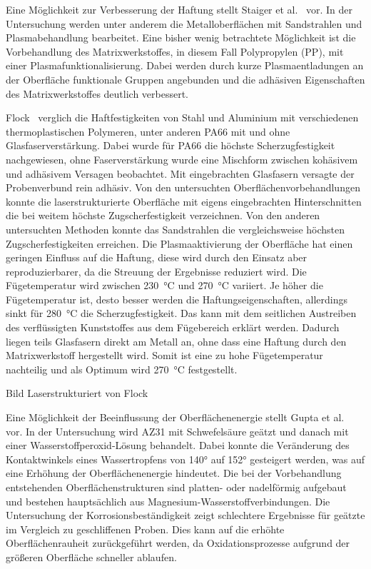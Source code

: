 Eine Möglichkeit zur Verbesserung der Haftung stellt Staiger et al.~\cite{Staiger2014} vor.
In der Untersuchung werden unter anderem die Metalloberflächen mit Sandstrahlen und Plasmabehandlung bearbeitet.
Eine bisher wenig betrachtete Möglichkeit ist die Vorbehandlung des Matrixwerkstoffes, in diesem Fall Polypropylen (PP), mit einer Plasmafunktionalisierung.
Dabei werden durch kurze Plasmaentladungen an der Oberfläche funktionale Gruppen angebunden und die adhäsiven Eigenschaften des Matrixwerkstoffes deutlich verbessert.

Flock~\cite{Flock2012} verglich die Haftfestigkeiten von Stahl und Aluminium mit verschiedenen thermoplastischen Polymeren, unter anderen PA66 mit und ohne Glasfaserverstärkung.
Dabei wurde für PA66 die höchste Scherzugfestigkeit nachgewiesen, ohne Faserverstärkung wurde eine Mischform zwischen kohäsivem und adhäsivem Versagen beobachtet.
Mit eingebrachten Glasfasern versagte der Probenverbund rein adhäsiv.
Von den untersuchten Oberflächenvorbehandlungen konnte die laserstrukturierte Oberfläche mit eigens eingebrachten Hinterschnitten die bei weitem höchste Zugscherfestigkeit verzeichnen.
Von den anderen untersuchten Methoden konnte das Sandstrahlen die vergleichsweise höchsten Zugscherfestigkeiten erreichen.
Die Plasmaaktivierung der Oberfläche hat einen geringen Einfluss auf die Haftung, diese wird durch den Einsatz aber reproduzierbarer, da die Streuung der Ergebnisse reduziert wird.
Die Fügetemperatur wird zwischen \SI{230}{\degreeCelsius} und \SI{270}{\degreeCelsius} variiert.
Je höher die Fügetemperatur ist, desto besser werden die Haftungseigenschaften, allerdings sinkt für \SI{280}{\degreeCelsius} die Scherzugfestigkeit.
Das kann mit dem seitlichen Austreiben des verflüssigten Kunststoffes aus dem Fügebereich erklärt werden.
Dadurch liegen teils Glasfasern direkt am Metall an, ohne dass eine Haftung durch den Matrixwerkstoff hergestellt wird.
Somit ist eine zu hohe Fügetemperatur nachteilig und als Optimum wird \SI{270}{\degreeCelsius} festgestellt.

Bild Laserstrukturiert von Flock

Eine Möglichkeit der Beeinflussung der Oberflächenenergie stellt Gupta et al.~\cite{Gupta2012} vor.
In der Untersuchung wird AZ31 mit Schwefelsäure geätzt und danach mit einer Wasserstoffperoxid-Lösung behandelt.
Dabei konnte die Veränderung des Kontaktwinkels eines Wassertropfens von \ang{140} auf \ang{152} gesteigert werden, was auf eine Erhöhung der Oberflächenenergie hindeutet.
Die bei der Vorbehandlung entstehenden Oberflächenstrukturen sind platten- oder nadelförmig aufgebaut und bestehen hauptsächlich aus Magnesium-Wasserstoffverbindungen.
Die Untersuchung der Korrosionsbeständigkeit zeigt schlechtere Ergebnisse für geätzte im Vergleich zu geschliffenen Proben.
Dies kann auf die erhöhte Oberflächenrauheit zurückgeführt werden, da Oxidationsprozesse aufgrund der größeren Oberfläche schneller ablaufen.

